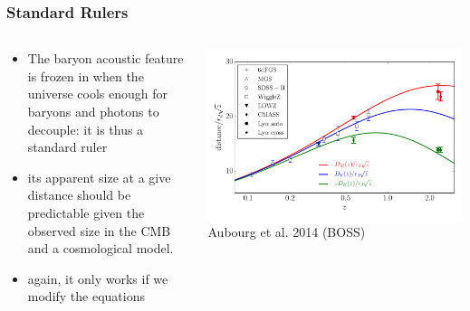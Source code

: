 \documentclass{beamer}
\begin{document}
\frame
{
    \frametitle{Standard Rulers}

    \fontsize{9}{0.8\baselineskip}
    \begin{columns}
        \begin{column}{0.5\textwidth}    
            \begin{itemize}

                \item The baryon acoustic feature is frozen in when the
                    universe cools enough for baryons and photons to decouple:
                    it is thus a standard ruler

                \item its apparent size at a give distance should be predictable
                    given the observed size in the CMB and a cosmological model.

                \item again, it only works if we modify the equations

            \end{itemize}
        \end{column}
        \begin{column}{0.5\textwidth}
            \begin{center}
                \includegraphics[width=\textwidth]{bao-all.pdf}
                \newline
                Aubourg et al. 2014 (BOSS)
            \end{center}
        \end{column}
    \end{columns}
}
\end{document}
